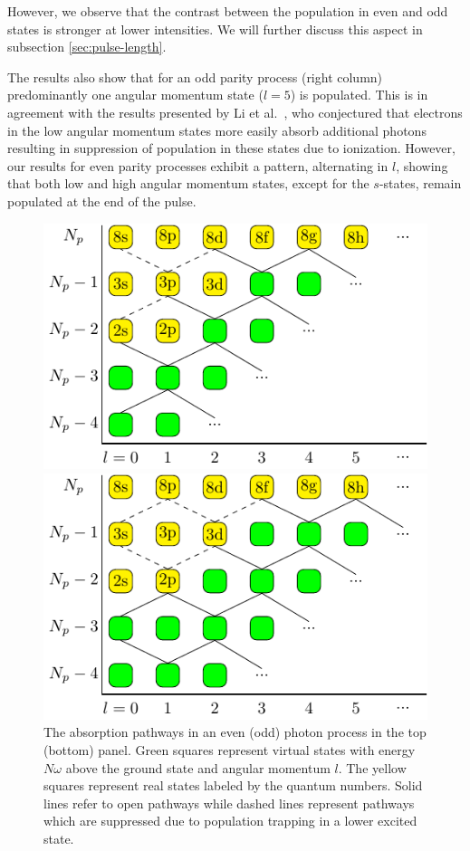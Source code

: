However, we observe that the contrast between the population in even and odd states is stronger at lower intensities. We will further discuss this aspect in subsection \ref{sec:pulse-length}.  

The results also show that for an odd parity process (right column) predominantly one angular momentum state ($l=5$) is populated. This is in agreement with the results presented by Li et al.\ \cite{li14b}, who conjectured that electrons in the low angular momentum states more easily absorb additional photons resulting in suppression of population in these states due to ionization. However, our results for even parity processes exhibit a pattern, alternating in $l$, showing that both low and high angular momentum states, except for the $s$-states, remain populated at the end of the pulse. 

\begin{figure}[h!]
\centering
\includegraphics[width=0.8\columnwidth]{figs/Rydberg/l_fig_even.pdf}

\vspace*{0.5cm}

\includegraphics[width=0.8\columnwidth]{figs/Rydberg/l_fig_odd.pdf}
\caption{
The absorption pathways in an even (odd) photon process in the top (bottom) panel. Green squares represent virtual states with energy $N\omega$ above the ground state and angular momentum $l$. The yellow squares represent real states labeled by the quantum numbers. Solid lines refer to open pathways while dashed lines represent pathways which are suppressed due to population trapping in a lower excited state.
}
\label{fig:pathways_ryd_linear}
\end{figure}

